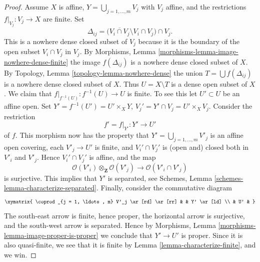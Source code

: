 \begin{proof}
\medskip\noindent
Assume $X$ is affine, $Y = \bigcup_{j = 1, \ldots, m} V_j$ with $V_j$ affine,
and the restrictions $f|_{V_j} : V_j \to X$ are finite.
Set
$$
\Delta_{ij} =
\Big(\overline{V_i \cap V_j} \setminus V_i \cap V_j\Big) \cap V_j.
$$
This is a nowhere dense closed subset of $V_j$ because it is the boundary
of the open subset $V_i \cap V_j$ in $V_j$. By
Morphisms, Lemma \ref{morphisms-lemma-image-nowhere-dense-finite}
the image $f(\Delta_{ij})$ is a nowhere dense closed subset of $X$. By
Topology, Lemma \ref{topology-lemma-nowhere-dense}
the union $T = \bigcup f(\Delta_{ij})$ is a nowhere dense closed
subset of $X$. Thus $U = X \setminus T$ is a dense open subset of $X$.
We claim that $f|_{f^{-1}(U)} : f^{-1}(U) \to U$ is finite.
To see this let $U' \subset U$ be an affine open.
Set $Y' = f^{-1}(U') = U' \times_X Y$,
$V_j' = Y' \cap V_j = U' \times_X V_j$. Consider the restriction
$$
f' = f|_{Y'} : Y' \longrightarrow U'
$$
of $f$. This morphism now has the property that
$Y' = \bigcup_{j = 1, \ldots, m} V'_j$ is an affine open covering,
each $V'_j \to U'$ is finite, and $V_i' \cap V_j'$ is (open and) closed
both in $V'_i$ and $V'_j$. Hence $V_i' \cap V_j'$ is affine, and the map
$$
\mathcal{O}(V'_i) \otimes_{\mathbf{Z}} \mathcal{O}(V'_j)
\longrightarrow
\mathcal{O}(V'_i \cap V'_j)
$$
is surjective. This implies that $Y'$ is separated, see
Schemes, Lemma \ref{schemes-lemma-characterize-separated}.
Finally, consider the commutative diagram
$$
\xymatrix{
\coprod_{j = 1, \ldots, m} V'_j \ar[rd] \ar[rr] & & Y' \ar[ld] \\
& U' &
}
$$
The south-east arrow is finite, hence proper, the horizontal arrow is
surjective, and the south-west arrow is separated. Hence by
Morphisms, Lemma \ref{morphisms-lemma-image-proper-is-proper}
we conclude that $Y' \to U'$ is proper. Since it is also quasi-finite,
we see that it is finite by Lemma \ref{lemma-characterize-finite},
and we win.
\end{proof}